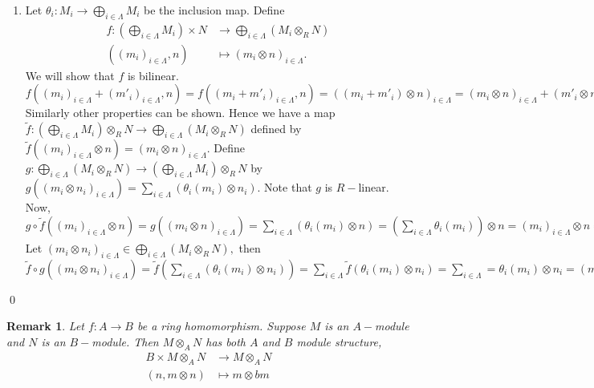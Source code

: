 \documentclass[11pt]{amsart}
\newtheorem{remark}[theorem]{Remark}%
\DeclareMathOperator{\id}{\text{id}}
\begin{document}
\begin{enumerate}
\item Let $\theta_i:M_i\to \displaystyle\bigoplus_{i\in\Lambda} M_i$ be the inclusion map. Define \begin{align*}
f:\left(\displaystyle\bigoplus_{i\in\Lambda} M_i\right)\times N&\to \displaystyle\bigoplus_{i\in\Lambda} (M_i\otimes_R N)\\
((m_i)_{i\in\Lambda},n)&\mapsto (m_i\otimes n)_{i\in\Lambda}.
\end{align*}
We will show that $f$ is bilinear. $f((m_i)_{i\in\Lambda}+(m'_i)_{i\in\Lambda},n)=f((m_i+m'_i)_{i\in\Lambda},n)=((m_i+m'_i)\otimes n)_{i\in\Lambda}=(m_i\otimes n)_{i\in\Lambda}+(m'_i\otimes n)_{i\times \Lambda}=f((m_i)_{i\in\Lambda},n)+f((m'_i)_{i\in\Lambda},n).$ Similarly other properties can be shown. Hence we have a map $\tilde{f}:\left(\displaystyle\bigoplus_{i\in\Lambda} M_i\right)\otimes_R N\to \displaystyle\bigoplus_{i\in\Lambda} (M_i\otimes_R N)$ defined by $\tilde{f}((m_i)_{i\in\Lambda}\otimes n)=(m_i\otimes n)_{i\in\Lambda}.$ Define $g: \displaystyle\bigoplus_{i\in\Lambda} (M_i\otimes_R N)\to \left(\displaystyle\bigoplus_{i\in\Lambda} M_i\right)\otimes_R N$ by $g((m_i\otimes n_i)_{i\in\Lambda})=\displaystyle\sum_{i\in\Lambda}(\theta_i(m_i)\otimes n_i)$. Note that $g$ is $R-$linear. Now, $g\circ\tilde{f}((m_i)_{i\in\Lambda}\otimes n)=g((m_i\otimes n)_{i\in\Lambda})=\displaystyle\sum_{i\in\Lambda} (\theta_i(m_i)\otimes n)=\left(\displaystyle\sum_{i\in\Lambda} \theta_i(m_i)\right)\otimes n=(m_i)_{i\in\Lambda}\otimes n\Rightarrow g\circ \tilde{f}=\id_{\left(\displaystyle\bigoplus_{i\in\Lambda} M_i\right)\otimes_R N}.$ Let $(m_i\otimes n_i)_{i\in\Lambda}\in \displaystyle\bigoplus_{i\in\Lambda} (M_i\otimes_R N),$ then $\tilde{f}\circ g((m_i\otimes n_i)_{i\in\Lambda})=\tilde{f}\left(\displaystyle\sum_{i\in\Lambda}(\theta_i(m_i)\otimes n_i)\right)=\displaystyle\sum_{i\in\Lambda}\tilde{f}(\theta_i(m_i)\otimes n_i)=\displaystyle\sum_{i\in\Lambda}=\theta_i(m_i)\otimes n_i=(m_i\otimes n_i)_{i\in\Lambda} \Rightarrow \tilde{f}\circ g=\id_{\displaystyle\bigoplus_{i\in\Lambda} (M_i\otimes_R N)}.$

\end{enumerate}
\qed

\begin{remark}
Let $f:A\to B$ be a ring homomorphism. Suppose $M$ is an $A-$module and $N$ is an $B-$module. Then $M\otimes_A N$ has both $A$ and $B$ module structure, \begin{align*}
 B\times M\otimes_A N&\to M\otimes_A N\\
 (n,m\otimes n)&\mapsto m\otimes bm
\end{align*}
\end{remark}
\end{document}
